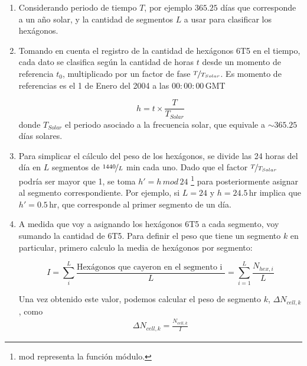       \begin{enumerate}
        \item Considerando periodo de tiempo  $T$, por ejemplo $365.25$ días que corresponde a un año solar,  y la cantidad de segmentos $L$ a usar para clasificar los hexágonos.

        \item Tomando en cuenta el registro de la cantidad de hexágonos 6T5 en el tiempo, cada dato se clasifica según la cantidad de horas $t$ desde un momento de referencia $t_0$, multiplicado por un factor de fase $\nicefrac{T}{T_{Solar}}$. Es momento de referencias es el 1 de Enero del 2004 a las $00:00:00\,$GMT

         \begin{equation*}
          h = t \times \frac{T}{T_{Solar}}
        \end{equation*}
        donde $T_{Solar}$ el periodo asociado a la frecuencia solar, que equivale a $\sim 365.25$  días solares. 
        
        \item Para simplicar el cálculo del peso de los hexágonos, se divide las 24 horas del día en $L$ segmentos de $\nicefrac{1440}{L}$ min cada uno. Dado que el factor $\nicefrac{T}{T_{Solar}}$ podría ser mayor que 1, se toma $h' = h\, mod \,24$ \footnote{mod representa la función módulo.} para posteriormente asignar al segmento correspondiente. Por ejemplo, si $L=24$ y  $h=24.5\,$hr implica que $h'= 0.5\,$hr, que corresponde al primer  segmento de un día.
       
       \item A medida que voy a asignando los hexágonos 6T5 a cada segmento, voy sumando la cantidad de 6T5. Para definir el peso que tiene un segmento $k$ en particular, primero calculo la media de hexágonos por segmento:
       
       \begin{equation}
         I = \sum^{L}_i \frac{\text{Hexágonos que cayeron en el segmento  i }}{L} = \sum^{L}_{i=1} \frac{N_{hex, i}}{L}
       \end{equation}
       
       Una vez obtenido este valor, podemos calcular el peso de segmento $k$,  $\Delta N_{cell,k}$,  como
        \begin{align}
         \Delta N_{cell,k} = \frac{N_{cell, k}}{I}
         \end{align} 
      \end{enumerate}

